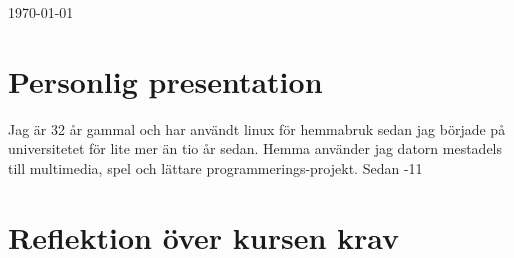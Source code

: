 \begin{titlepage}
	\vfill\vfill\vfill %
	
	{\large\today} %
	
	
	 
	
	\vfill %
	
\end{titlepage}


\section{Personlig presentation}

Jag är 32 år gammal och har användt linux för hemmabruk sedan jag började på universitetet för lite mer än tio år sedan. Hemma använder jag datorn mestadels till multimedia, spel och lättare programmerings-projekt. Sedan -11 

\section{Reflektion över kursen krav}

\lipsum[2] %


